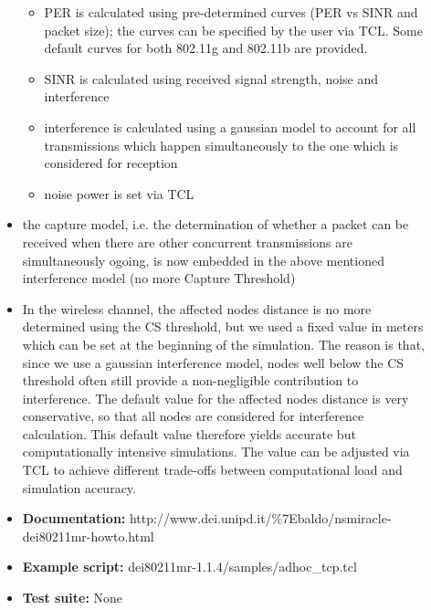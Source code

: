 \begin{description}
\begin{itemize}
\begin{itemize}
          \item PER is calculated using pre-determined curves (PER vs SINR and packet size); the curves can be specified by the user via TCL. Some default curves for both 802.11g and 802.11b are provided.
          \item SINR is calculated using received signal strength, noise and interference
          \item interference is calculated using a gaussian model to account for all transmissions which happen simultaneously to the one which is considered for reception
          \item noise power is set via TCL
\end{itemize}
    \item the capture model, i.e. the determination of whether a packet can be received when there are other concurrent transmissions are simultaneously ogoing, is now embedded in the above mentioned interference model (no more Capture Threshold)
    \item In the wireless channel, the affected nodes distance is no more determined using the CS threshold, but we used a fixed value in meters 
which can be set at the beginning of the simulation. The reason is that, since we use a gaussian interference model, nodes well below the CS threshold often still provide a non-negligible contribution to interference. The default value for the affected nodes distance 
is very conservative, so that all nodes are considered for interference calculation. This default value therefore yields accurate but computationally intensive simulations. The value can be adjusted via TCL to achieve different trade-offs between computational load and simulation accuracy.
\end{itemize}
\begin{itemize}
\item {\bf Documentation:} 
http://www.dei.unipd.it/\%7Ebaldo/nsmiracle-dei80211mr-howto.html
\item {\bf Example script:} dei80211mr-1.1.4/samples/adhoc\_tcp.tcl
\item {\bf Test suite:} None
\end{itemize}
\end{description}
  
